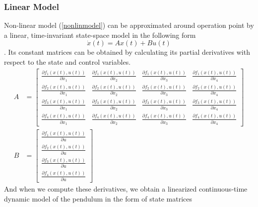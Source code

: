 \subsubsection{Linear Model}
Non-linear model (\ref{nonlinmodel}) can be approximated around operation point by a linear, time-invariant state-space model in the following form
\begin{equation}\dot{x}(t) = Ax(t) + Bu(t)\end{equation}.
Its constant matrices can be obtained by calculating its partial derivatives with respect to the state and control variables.
\begin{subequations}
	\begin{align}
	A &= \begin{bmatrix}
	\frac{\partial f_1(x(t),u(t))}{\partial x_1}&\frac{\partial f_1(x(t),u(t))}{\partial x_2}&\frac{\partial f_1(x(t),u(t))}{\partial x_3}&\frac{\partial f_1(x(t),u(t))}{\partial x_4}\\
	\frac{\partial f_2(x(t),u(t))}{\partial x_1}&\frac{\partial f_2(x(t),u(t))}{\partial x_2}&\frac{\partial f_2(x(t),u(t))}{\partial x_3}&\frac{\partial f_2(x(t),u(t))}{\partial x_4}\\
	\frac{\partial f_3(x(t),u(t))}{\partial x_1}&\frac{\partial f_3(x(t),u(t))}{\partial x_2}&\frac{\partial f_3(x(t),u(t))}{\partial x_3}&\frac{\partial f_3(x(t),u(t))}{\partial x_4}\\
	\frac{\partial f_4(x(t),u(t))}{\partial x_1}&\frac{\partial f_4(x(t),u(t))}{\partial x_2}&\frac{\partial f_4(x(t),u(t))}{\partial x_3}&\frac{\partial f_4(x(t),u(t))}{\partial x_4}
	\end{bmatrix}\\ 
	B &= \begin{bmatrix}
	\frac{\partial f_1(x(t),u(t))}{\partial u}\\\frac{\partial f_2(x(t),u(t))}{\partial u}\\\frac{\partial f_3(x(t),u(t))}{\partial u}\\\frac{\partial f_4(x(t),u(t))}{\partial u}
	\end{bmatrix}
	\end{align}
\end{subequations}
And when we compute these derivatives, we obtain a linearized continuous-time dynamic model of the pendulum in the form of state matrices
